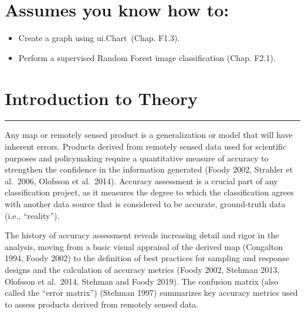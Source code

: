 \documentclass[
  letterpaper,
  DIV=11,
  numbers=noendperiod]{scrreprt}
\providecommand{\tightlist}{%
  \setlength{\itemsep}{0pt}\setlength{\parskip}{0pt}}\usepackage{longtable,booktabs,array}
\begin{document}
\hypertarget{assumes-you-know-how-to-6}{%
\section*{Assumes you know how to:}\label{assumes-you-know-how-to-6}}


\begin{itemize}
\tightlist
\item
  \hspace{0pt}\hspace{0pt}Create a graph using ui.Chart~(Chap. F1.3).
\item
  Perform a supervised Random Forest image classification (Chap. F2.1).
\end{itemize}

\hypertarget{introduction-to-theory-2}{%
\section*{Introduction to Theory}\label{introduction-to-theory-2}}


\begin{center}\rule{0.5\linewidth}{0.5pt}\end{center}

Any map or remotely sensed product is a generalization or model that
will have inherent errors. Products derived from remotely sensed data
used for scientific purposes and policymaking require a quantitative
measure of accuracy to strengthen the confidence in the information
generated (Foody 2002, Strahler et al.~2006, Olofsson et al.~2014).
Accuracy assessment is a crucial part of any classification project, as
it measures the degree to which the classification agrees with another
data source that is considered to be accurate, ground-truth data (i.e.,
``reality'').

The history of accuracy assessment reveals increasing detail and rigor
in the analysis, moving from a basic visual appraisal of the derived map
(Congalton 1994, Foody 2002) to the definition of best practices for
sampling and response designs and the calculation of accuracy metrics
(Foody 2002, Stehman 2013, Olofsson et al.~2014, Stehman and Foody
2019). The confusion matrix (also called the ``error matrix'') (Stehman
1997) summarizes key accuracy metrics used to assess products derived
from remotely sensed data.
\end{document}
